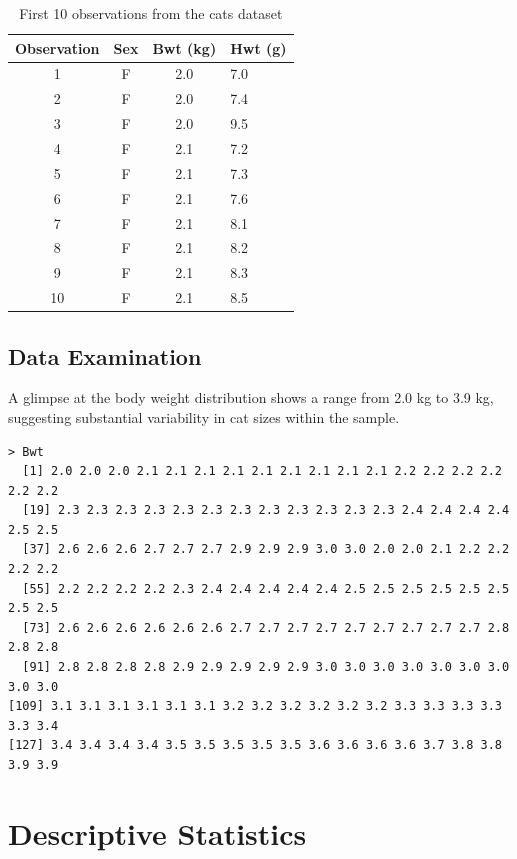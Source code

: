 \documentclass[a4paper,12pt]{article}
\begin{document}
\begin{table}[H]
    \centering
    \caption{First 10 observations from the cats dataset}
    \label{tab:first10}
    \begin{tabular}{@{}cccl@{}}
        \toprule
        \textbf{Observation} & \textbf{Sex} & \textbf{Bwt (kg)} & \textbf{Hwt (g)} \\
        \midrule
        1 & F & 2.0 & 7.0 \\
        2 & F & 2.0 & 7.4 \\
        3 & F & 2.0 & 9.5 \\
        4 & F & 2.1 & 7.2 \\
        5 & F & 2.1 & 7.3 \\
        \rowcolor{gray!15} 6 & F & 2.1 & 7.6 \\
        7 & F & 2.1 & 8.1 \\
        8 & F & 2.1 & 8.2 \\
        9 & F & 2.1 & 8.3 \\
        10 & F & 2.1 & 8.5 \\
        \bottomrule
    \end{tabular}
\end{table}

\subsection{Data Examination}
\label{subsec:examination}

A glimpse at the body weight distribution shows a range from 2.0 kg to 3.9 kg, suggesting substantial variability in cat sizes within the sample.

\begin{lstlisting}[caption={Body weight distribution}, label={lst:bwt}]
> Bwt
  [1] 2.0 2.0 2.0 2.1 2.1 2.1 2.1 2.1 2.1 2.1 2.1 2.1 2.2 2.2 2.2 2.2 2.2 2.2
  [19] 2.3 2.3 2.3 2.3 2.3 2.3 2.3 2.3 2.3 2.3 2.3 2.3 2.4 2.4 2.4 2.4 2.5 2.5       
  [37] 2.6 2.6 2.6 2.7 2.7 2.7 2.9 2.9 2.9 3.0 3.0 2.0 2.0 2.1 2.2 2.2 2.2 2.2       
  [55] 2.2 2.2 2.2 2.2 2.3 2.4 2.4 2.4 2.4 2.4 2.5 2.5 2.5 2.5 2.5 2.5 2.5 2.5       
  [73] 2.6 2.6 2.6 2.6 2.6 2.6 2.7 2.7 2.7 2.7 2.7 2.7 2.7 2.7 2.7 2.8 2.8 2.8       
  [91] 2.8 2.8 2.8 2.8 2.9 2.9 2.9 2.9 2.9 3.0 3.0 3.0 3.0 3.0 3.0 3.0 3.0 3.0       
[109] 3.1 3.1 3.1 3.1 3.1 3.1 3.2 3.2 3.2 3.2 3.2 3.2 3.3 3.3 3.3 3.3 3.3 3.4
[127] 3.4 3.4 3.4 3.4 3.5 3.5 3.5 3.5 3.5 3.6 3.6 3.6 3.6 3.7 3.8 3.8 3.9 3.9       
\end{lstlisting}

\section{Descriptive Statistics}
\label{sec:descriptive}
\end{document}
